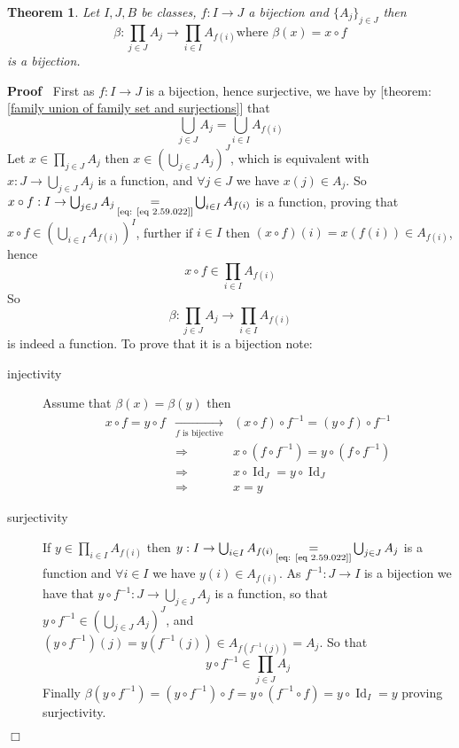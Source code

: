 \documentclass{book}
\newcommand{\Rightarrowlim}{\mathop{\rightarrow}\limits}
\newcommand{\equallim}{\mathop{=}\limits}
\newcommand{\tmop}[1]{\ensuremath{\operatorname{#1}}}
\newenvironment{proof}{\noindent\textbf{Proof\ }}{\hspace*{\fill}$\Box$\medskip}
\newtheorem{theorem}{Theorem}
\begin{document}
\begin{theorem}
  \label{family product and index transformation}Let $I, J, B$ be classes, $f
  : I \rightarrow J$ a bijection and $\{ A_j \}_{j \in J}$ then
  \[ \beta : \prod_{j \in J} A_j \rightarrow \prod_{i \in I} A_{f (i)} \text{
     where } \beta (x) = x \circ f \]
  is a bijection.
\end{theorem}

\begin{proof}
  First as $f : I \rightarrow J$ is a bijection, hence surjective, we have by
  [theorem: \ref{family union of family set and surjections}] that
  \begin{equation}
    \label{eq 2.59.022} \bigcup_{j \in J} A_j = \bigcup_{i \in I} A_{f (i)}
  \end{equation}
  Let $x \in \prod_{j \in J} A_j$ then $x \in \left( \bigcup_{j \in J} A_j
  \right)^J$, which is equivalent with $x : J \rightarrow \bigcup_{j \in J}
  A_j$ is a function, and $\forall j \in J$ we have $x (j) \in A_j$. So $x
  \circ f : I \rightarrow \bigcup_{j \in J} A_j \equallim_{\text{[eq: \ref{eq
  2.59.022}]}} \bigcup_{i \in I} A_{f (i)}$ is a function, proving that $x
  \circ f \in \left( \bigcup_{i \in I} A_{f (i)} \right)^I$, further if $i \in
  I$ then $(x \circ f) (i) = x (f (i)) \in A_{f (i)}$, hence
  \begin{equation}
    \label{eq 2.60.022} x \circ f \in \prod_{i \in I} A_{f (i)}
  \end{equation}
  So
  \[ \beta : \prod_{j \in J} A_j \rightarrow \prod_{i \in I} A_{f (i)}
     \text{} \]
  is indeed a function. To prove that it is a bijection note:
  \begin{description}
    \item[injectivity] Assume that $\beta (x) = \beta (y)$ then
    \begin{eqnarray*}
      x \circ f = y \circ f & \Rightarrowlim_{f \text{ is bijective}} & (x
      \circ f) \circ f^{- 1} = (y \circ f) \circ f^{- 1}\\
      & \Rightarrow & x \circ (f \circ f^{- 1}) = y \circ (f \circ f^{- 1})\\
      & \Rightarrow & x \circ \tmop{Id}_J = y \circ \tmop{Id}_J\\
      & \Rightarrow & x = y
    \end{eqnarray*}
    \item[surjectivity] If $y \in \prod_{i \in I} A_{f (i)}$ then $y : I
    \rightarrow \bigcup_{i \in I} A_{f (i)} \equallim_{\text{[eq: \ref{eq
    2.59.022}]}} \bigcup_{j \in J} A_j$ is a function and $\forall i \in I$ we
    have $y (i) \in A_{f (i)}$. As $f^{- 1} : J \rightarrow I$ is a bijection
    we have that $y \circ f^{- 1} : J \rightarrow \bigcup_{j \in J} A_j$ is a
    function, so that $y \circ f^{- 1} \in \left( \bigcup_{j \in J} A_j
    \right)^J$, and $(y \circ f^{- 1})  (j) = y (f^{- 1} (j)) \in A_{f (f^{-
    1} (j))} = A_j$. So that
    \[ y \circ f^{- 1} \in \prod_{j \in J} A_j \]
    Finally $\beta (y \circ f^{- 1}) = (y \circ f^{- 1}) \circ f = y \circ
    (f^{- 1} \circ f) = y \circ \tmop{Id}_I = y$ proving surjectivity.
  \end{description}
\end{proof}
\end{document}
